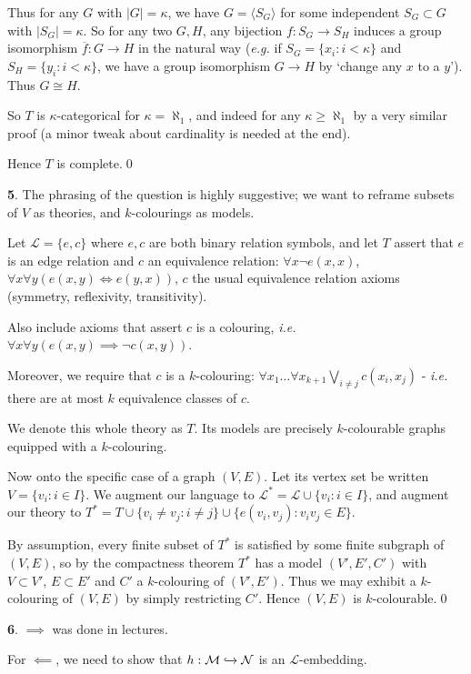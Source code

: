 \documentclass[]{article}
\theoremstyle{custhm}
\theoremstyle{cusdef}
\theoremstyle{custhm}
\theoremstyle{custhm}
\theoremstyle{custhm}
\theoremstyle{custhm}
\theoremstyle{cusdef}
\theoremstyle{remark}
\newcommand{\N}{\mathcal{N}}
\newcommand{\ra}{\rightarrow}
\renewcommand{\L}{\mathcal{L}}
\renewcommand{\it}[1]{\textit{#1}}
\newcommand{\M}{\mathcal{M}}
\renewcommand{\bar}{\overline}
\begin{document}
Thus for any $G$ with $|G| = \kappa$, we have $G = \langle S_G \rangle$ for some independent $S_G \subset G$ with $|S_G| = \kappa$. So for any two $G,H$, any bijection $f:S_G\ra S_H$ induces a group isomorphism $\bar{f}:G\ra H$ in the natural way (\it{e.g.} if $S_G = \{x_i: i<\kappa\}$ and $S_H = \{y_i: i<\kappa\}$, we have a group isomorphism $G\ra H$ by `change any $x$ to a $y$'). Thus $G\cong H$.

So $T$ is $\kappa$-categorical for $\kappa = \aleph_1$, and indeed for any $\kappa \ge \aleph_1$ by a very similar proof (a minor tweak about cardinality is needed at the end).

Hence $T$ is complete.\qed

\textbf{5}. The phrasing of the question is highly suggestive; we want to reframe subsets of $V$ as theories, and $k$-colourings as models.

Let $\L = \{e,c\}$ where $e,c$ are both binary relation symbols, and let $T$ assert that $e$ is an edge relation and $c$ an equivalence relation: $\forall x \neg e(x,x)$, $\forall x \forall y (e(x,y)\iff e(y,x))$, $c$ the usual equivalence relation axioms (symmetry, reflexivity, transitivity).

Also include axioms that assert $c$ is a colouring, \it{i.e.} $\forall x\forall y (e(x,y)\implies \neg c(x,y))$.

Moreover, we require that $c$ is a $k$-colouring: $\forall x_1\dots\forall x_{k+1}\bigvee_{i\ne j}c(x_i,x_j)$ - \it{i.e.} there are at most $k$ equivalence classes of $c$.

We denote this whole theory as $T$. Its models are precisely $k$-colourable graphs equipped with a $k$-colouring.

Now onto the specific case of a graph $(V,E)$. Let its vertex set be written $V = \{v_i: i\in I\}$. We augment our language to $\L^\ast = \L \cup \{v_i: i\in I\}$, and augment our theory to $T^\ast = T\cup \{ v_i\ne v_j :i\ne j \}\cup\{e(v_i,v_j):v_iv_j\in E\}$.

By assumption, every finite subset of $T^\ast$ is satisfied by some finite subgraph of $(V,E)$, so by the compactness theorem $T^\ast$ has a model $(V',E',C')$ with $V\subset V'$, $E\subset E'$ and $C'$ a $k$-colouring of $(V',E')$. Thus we may exhibit a $k$-colouring of $(V,E)$ by simply restricting $C'$. Hence $(V,E)$ is $k$-colourable.\qed

\textbf{6}. $\implies$ was done in lectures.

For $\impliedby$, we need to show that $h:\M\xhookrightarrow{}\N$ is an $\L$-embedding.
\end{document}
